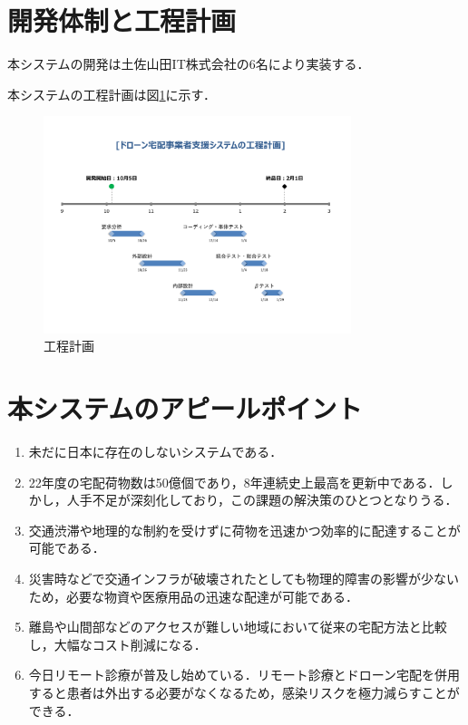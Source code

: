 \documentclass[a4paper, titlepage]{jsarticle}
\begin{document}
\section{開発体制と工程計画}
本システムの開発は土佐山田IT株式会社の6名により実装する．

本システムの工程計画は図\ref{fig:schedule}に示す．
\begin{figure}[htbp]
  \label{fig:schedule}
  \centering
  \includegraphics[width=0.8\textwidth]{schedule.pdf}
  \caption{工程計画}
\end{figure}

\section{本システムのアピールポイント}
\begin{enumerate}
  \item 未だに日本に存在のしないシステムである．
  \item 22年度の宅配荷物数は50億個であり，8年連続史上最高を更新中である．しかし，人手不足が深刻化しており，この課題の解決策のひとつとなりうる．
  \item 交通渋滞や地理的な制約を受けずに荷物を迅速かつ効率的に配達することが可能である．
  \item 災害時などで交通インフラが破壊されたとしても物理的障害の影響が少ないため，必要な物資や医療用品の迅速な配達が可能である．
  \item 離島や山間部などのアクセスが難しい地域において従来の宅配方法と比較し，大幅なコスト削減になる．
  \item 今日リモート診療が普及し始めている．リモート診療とドローン宅配を併用すると患者は外出する必要がなくなるため，感染リスクを極力減らすことができる．
\end{enumerate}
\end{document}
